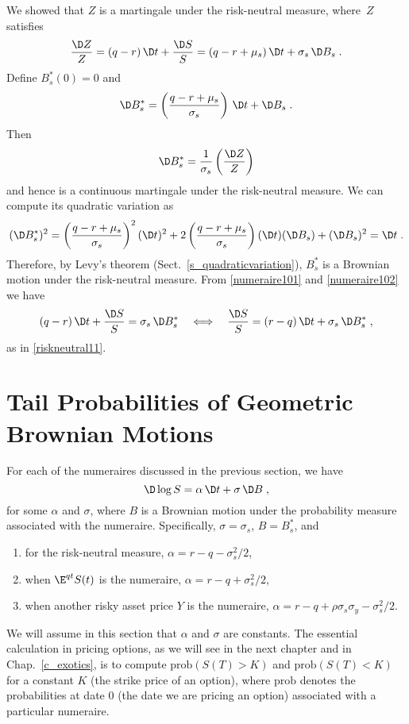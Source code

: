We showed that $Z$ is a martingale under the risk-neutral measure, where~$Z$ satisfies
\begin{equation}\label{numeraire101}
\frac{\D Z}{Z} = (q-r)\,\D t + \frac{\D S}{S} = (q-r+\mu_s)\,\D t + \sigma_s\,\D B_s\;.
\end{equation}
Define $B^*_s(0) = 0$ and
\begin{equation}\label{numeraire102}
\D B^*_s = \left(\frac{q-r+\mu_s}{\sigma_s}\right)\,\D t + \D B_s\;.
\end{equation}
Then 
$$\D B^*_s = \frac{1}{\sigma_s}\left(\frac{\D Z}{Z}\right)$$
and hence is a continuous martingale under the risk-neutral measure.  We can compute its quadratic variation as
$$(\D B^*_s)^2 = \left(\frac{q-r+\mu_s}{\sigma_s}\right)^2(\D t)^2 + 2\left(\frac{q-r+\mu_s}{\sigma_s}\right)(\D t)(\D B_s) + (\D B_s)^2 = \D t\; .$$
Therefore, by Levy's theorem (Sect.~\ref{s_quadraticvariation}), $B^*_s$ is a Brownian motion under the risk-neutral measure.   From  \eqref{numeraire101} and \eqref{numeraire102} we have
$$(q-r)\,\D t + \frac{\D S}{S} = \sigma_s\,\D B^*_s \quad \Longleftrightarrow \quad \frac{\D S}{S} = (r-q)\,\D t + \sigma_s\,\D B^*_s\;,$$
as in  \eqref{riskneutral11}.

\section{Tail Probabilities of Geometric Brownian Motions}\label{s_tailprobs}

For each of the numeraires discussed in the previous section, we have
\begin{equation}\label{tailprob1}
\D \log S = \alpha\,\D t + \sigma\,\D B\;,
\end{equation}
for some $\alpha$ and $\sigma$, where $B$ is a Brownian motion under the probability measure associated with the numeraire.  Specifically, $\sigma=\sigma_s$, $B=B^*_s$, and

\begin{enumerate}
\renewcommand{\labelenumi}{(\arabic{enumi})}
\item for the risk-neutral measure, $\alpha = r-q-\sigma_s^2/2$,
\item when $\E^{qt}S(t)$ is the numeraire, $\alpha = r-q +\sigma_s^2/2$,
\item when another risky asset price $Y$ is the numeraire, $\alpha = r-q+\rho\sigma_s\sigma_y-\sigma_s^2/2$.
\end{enumerate}

We will assume in this section that $\alpha$ and $\sigma$ are constants.
The essential calculation in pricing options, as we will see in the next chapter and in Chap.~\ref{c_exotics}, is to compute $\text{prob}(S(T)>K)$ and $\text{prob}(S(T)<K)$ for a constant $K$ (the strike price of an option), where $\text{prob}$ denotes the probabilities at date 0 (the date we are pricing an option) associated with a particular numeraire.  


